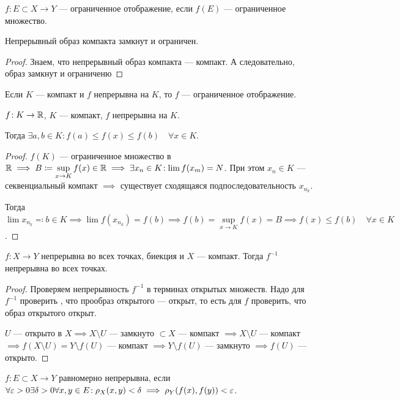 \begin{definition}
    $f\!: E \subset X \to Y$ --- ограниченное отображение, если  $f(E)$ --- ограниченное множество.
\end{definition}
\begin{consequence}
    Непрерывный образ компакта замкнут и ограничен.
\end{consequence}
\begin{proof}
    Знаем, что непрерывный образ компакта --- компакт. А следовательно, образ замкнут и ограниченю
\end{proof}
\begin{consequence}
    Если $K$ --- компакт и  $f$ непрерывна на  $K$, то $f$ --- ограниченное отображение.
\end{consequence}
\begin{consequence}
    $f\!: K \to \mathbb{R}$,  $K$ --- компакт,  $f$ непрерывна на  $K$.

    Тогда  $\exists a,b \in K\!: f(a) \le f(x) \le f(b) \quad \forall x \in K$.
\end{consequence}
\begin{proof}
    $f(K)$ --- ограниченное множество в  $\mathbb{R} \implies B \coloneqq \sup\limits_{x \to K} f(x) \in \mathbb{R} \implies \exists x_n \in K\!: \lim f(x_m) = N$. При этом  $x_n \in K$ --- секвенциальный компакт  $\implies$ существует сходящаяся подпоследовательность $x_{n_k}$.

    Тогда  $\lim x_{n_k} \eqqcolon b \in K \implies \lim f(x_{n_k}) = f(b) \implies f(b) = \sup\limits_{x \to K} f(x) = B \implies f(x) \le f(b) \quad \forall x \in K$.
\end{proof}
\begin{theorem}
    $f\!: X \to Y$ непрерывна во всех точках, биекция и  $X$ --- компакт. Тогда  $f^{-1}$ непрерывна во всех точках.
\end{theorem}
\begin{proof}
    Проверяем непрерывность $f^{-1}$ в терминах открытых множеств. Надо для  $f^{-1}$ проверить , что прообраз открытого --- открыт, то  есть для  $f$ проверить, что образ открытого открыт.

     $U$ --- открыто в  $X \implies X \setminus U$ --- замкнуто  $\subset X$ --- компакт  $\implies X \setminus U$ --- компакт  $\implies f(X \setminus U) = Y \setminus f(U)$ --- компакт  $\implies Y \setminus f(U)$ --- замкнуто  $\implies f(U)$ --- открыто.
\end{proof}
\begin{definition}
    $f\!: E \subset X \to Y$ равномерно непрерывна, если  $\forall \varepsilon > 0 \exists \delta > 0 \forall x, y \in E\!: \rho_X(x, y) < \delta \implies \rho_Y(f(x), f(y)) < \varepsilon$.
\end{definition}
